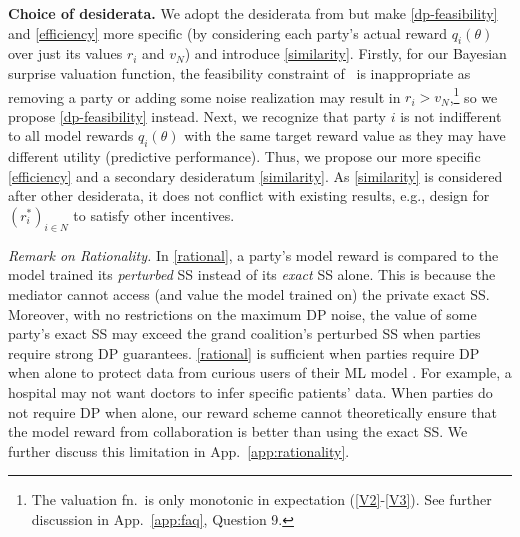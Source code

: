 \documentclass{article}
\theoremstyle{plain}
\theoremstyle{definition}
\theoremstyle{remark}
\renewcommand{\citet}[1]{\cite{#1}}
\begin{document}
\textbf{Choice of desiderata.} We adopt the desiderata from \cite{simcollaborative} but make \ref{dp-feasibility} and \ref{efficiency} more specific (by considering each party's actual reward $q_i(\theta)$ over just its values $r_i$ and $v_N$) and introduce \ref{similarity}.
Firstly, for our Bayesian surprise valuation function, the feasibility constraint of~\citet{simcollaborative} is inappropriate as removing a party or adding some noise realization may result in $r_i > v_N$,\footnote{The valuation fn.~is only monotonic in expectation (\ref{V2}-\ref{V3}). See further discussion in App.~\ref{app:faq}, Question 9.}
so we propose \ref{dp-feasibility} instead.
Next, we recognize that party $i$ is not indifferent to all model rewards $q_i(\theta)$ with the same target reward value as they may have different utility (predictive performance). Thus, we propose our more specific {\ref{efficiency}} and a secondary desideratum \ref{similarity}. As \ref{similarity} is considered after other desiderata, it does not conflict with existing results, e.g., design for $(r^*_i)_{i \in N}$ to satisfy other incentives.

\emph{Remark on Rationality.} In \ref{rational}, a party's model reward is compared to the model trained its \emph{perturbed} SS instead of its \emph{exact} SS alone. 
This is because the mediator cannot access (and value the model trained on) the private exact SS. Moreover, with no restrictions on the maximum DP noise, the value of some party's exact SS may exceed the grand coalition's perturbed SS when parties require strong DP guarantees.
\ref{rational} is sufficient when parties require DP when alone to protect data from curious users of their ML model \cite{abadi2016deep,bernstein2018expfam,kulkarni2021glm}. For example, a hospital may not want doctors to infer specific patients' data.
When parties do not require DP when alone, our reward scheme cannot theoretically ensure that the model reward from collaboration is better than using the exact SS. We further discuss this limitation in App.~\ref{app:rationality}.
\end{document}
